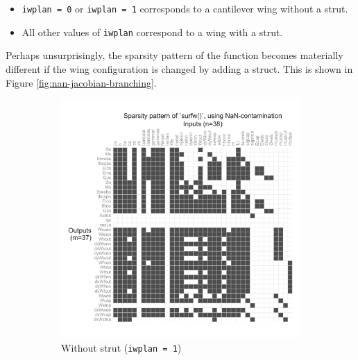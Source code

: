 \begin{itemize}[noitemsep]
    \item \texttt{iwplan = 0} or \texttt{iwplan = 1} corresponds to a cantilever wing without a strut.
    \item All other values of \texttt{iwplan} correspond to a wing with a strut.
\end{itemize}

Perhaps unsurprisingly, the sparsity pattern of the function becomes materially different if the wing configuration is changed by adding a struct. This is shown in Figure \ref{fig:nan-jacobian-branching}.

\begin{figure}[H]
    \centering
    \begin{subfigure}{0.49\textwidth}
        \centering
        \includegraphics[width=\textwidth]{../figures/nan-propagation/image4.png}
        \caption{Without strut (\texttt{iwplan = 1})}
    \end{subfigure}
    \begin{subfigure}{0.49\textwidth}
        \centering

\end{subfigure}
\end{figure}
